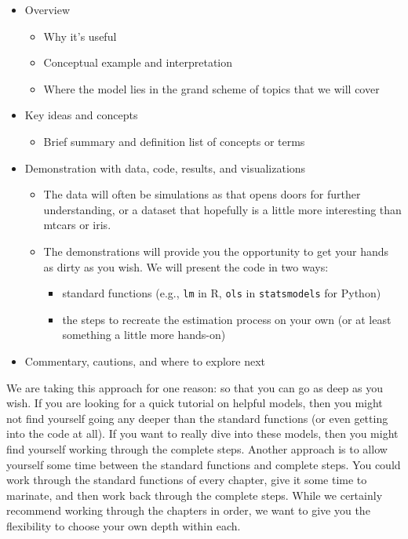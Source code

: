 \documentclass[
  letterpaper,
]{krantz}
\providecommand{\tightlist}{%
  \setlength{\itemsep}{0pt}\setlength{\parskip}{0pt}}\usepackage{longtable,booktabs,array}
\begin{document}
\begin{itemize}
\tightlist
\item
  Overview

  \begin{itemize}
  \tightlist
  \item
    Why it's useful
  \item
    Conceptual example and interpretation
  \item
    Where the model lies in the grand scheme of topics that we will
    cover
  \end{itemize}
\item
  Key ideas and concepts

  \begin{itemize}
  \tightlist
  \item
    Brief summary and definition list of concepts or terms
  \end{itemize}
\item
  Demonstration with data, code, results, and visualizations

  \begin{itemize}
  \tightlist
  \item
    The data will often be simulations as that opens doors for further
    understanding, or a dataset that hopefully is a little more
    interesting than mtcars or iris.
  \item
    The demonstrations will provide you the opportunity to get your
    hands as dirty as you wish. We will present the code in two ways:

    \begin{itemize}
    \tightlist
    \item
      standard functions (e.g., \texttt{lm} in R, \texttt{ols} in
      \texttt{statsmodels} for Python)
    \item
      the steps to recreate the estimation process on your own (or at
      least something a little more hands-on)
    \end{itemize}
  \end{itemize}
\item
  Commentary, cautions, and where to explore next
\end{itemize}

We are taking this approach for one reason: so that you can go as deep
as you wish. If you are looking for a quick tutorial on helpful models,
then you might not find yourself going any deeper than the standard
functions (or even getting into the code at all). If you want to really
dive into these models, then you might find yourself working through the
complete steps. Another approach is to allow yourself some time between
the standard functions and complete steps. You could work through the
standard functions of every chapter, give it some time to marinate, and
then work back through the complete steps. While we certainly recommend
working through the chapters in order, we want to give you the
flexibility to choose your own depth within each.
\end{document}
